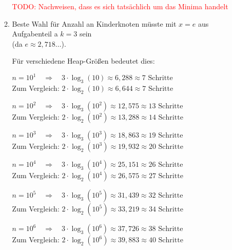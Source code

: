 \documentclass{article}
\begin{document}
\begin{enumerate}[\bfseries1.]
\begin{enumerate}
                \textcolor{red}{TODO: Nachweisen, dass es sich tatsächlich um
                das Minima handelt}
            \item
                Beste Wahl für Anzahl an Kinderknoten müsste mit $x=e$ aus
                Aufgabenteil a $k=3$ sein 
                \\(da $e\approx2,718\ldots$).
                
                Für verschiedene Heap-Größen bedeutet dies:
                
                $n = 10^1 \quad \Rightarrow \quad 3 \cdot \log_3(10) \approx
                6,288 \approx 7 \text{ Schritte} $
                \\ Zum Vergleich: $2 \cdot \log_2(10) \approx 6,644 \approx 7
                \text{ Schritte}$
                
                $n = 10^2 \quad \Rightarrow \quad 3 \cdot \log_3(10^2) \approx
                12,575 \approx 13 \text{ Schritte} $
                \\ Zum Vergleich: $2 \cdot \log_2(10^2) \approx 13,288 \approx
                14 \text{ Schritte}$
                
                $n = 10^3 \quad \Rightarrow \quad 3 \cdot \log_3(10^3) \approx
                18,863 \approx 19 \text{ Schritte} $
                \\ Zum Vergleich: $2 \cdot \log_2(10^3) \approx 19,932 \approx
                20 \text{ Schritte}$
                
                $n = 10^4 \quad \Rightarrow \quad 3 \cdot \log_3(10^4) \approx
                25,151 \approx 26 \text{ Schritte} $
                \\ Zum Vergleich: $2 \cdot \log_2(10^4) \approx 26,575 \approx
                27 \text{ Schritte}$
                
                $n = 10^5 \quad \Rightarrow \quad 3 \cdot \log_3(10^5) \approx
                31,439 \approx 32 \text{ Schritte} $
                \\ Zum Vergleich: $2 \cdot \log_2(10^5) \approx 33,219 \approx
                34 \text{ Schritte}$
                
                $n = 10^6 \quad \Rightarrow \quad 3 \cdot \log_3(10^6) \approx
                37,726 \approx 38 \text{ Schritte} $
                \\ Zum Vergleich: $2 \cdot \log_2(10^6) \approx 39,883 \approx
                40 \text{ Schritte}$
                

\end{enumerate}
\end{enumerate}
\end{document}
